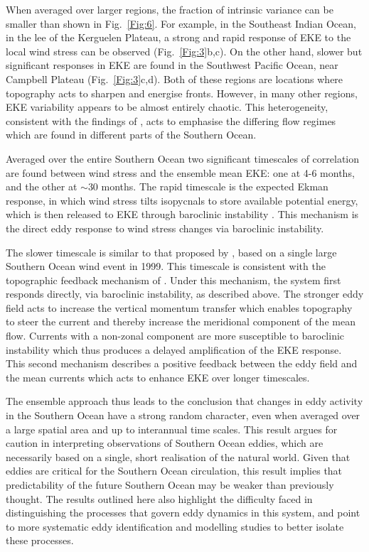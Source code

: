 \documentclass[linenumbers]{agujournal2019}
\begin{document}
When averaged over larger regions, the fraction of intrinsic variance can be smaller than shown in Fig.~\ref{Fig:6}.
For example, in the Southeast Indian Ocean, in the lee of the Kerguelen Plateau, a strong and rapid response of EKE to the local wind stress can be observed (Fig.~\ref{Fig:3}b,c).
On the other hand, slower but significant responses in EKE are found in the Southwest Pacific Ocean, near Campbell Plateau (Fig.~\ref{Fig:3}c,d).
Both of these regions are locations where topography acts to sharpen and energise fronts.
However, in many other regions, EKE variability appears to be almost entirely chaotic.
This heterogeneity, consistent with the findings of \citet{Patara2016}, acts to emphasise the differing flow regimes which are found in different parts of the Southern Ocean.

Averaged over the entire Southern Ocean two significant timescales of correlation are found between wind stress and the ensemble mean EKE: one at 4-6 months, and the other at $\sim$30 months.
The rapid timescale is the expected Ekman response, in which wind stress tilts isopycnals to store available potential energy, which is then released to EKE through baroclinic instability \citep[e.g.][]{Sinha2016}.
This mechanism is the direct eddy response to wind stress changes via baroclinic instability.

The slower timescale is similar to that proposed by \citet{Meredith-Hogg-2006}, based on a single large Southern Ocean wind event in 1999.
This timescale is consistent with the  topographic feedback mechanism of \citet{Hogg-Blundell-2006}.
Under this mechanism, the system first responds directly, via baroclinic instability, as described above. 
The stronger eddy field acts to increase the vertical momentum transfer which enables topography to steer the current and thereby increase the meridional component of the mean flow. 
Currents with a non-zonal component are more susceptible to baroclinic instability which thus produces a delayed amplification of the EKE response.
This second mechanism describes a positive feedback between the eddy field and the mean currents which acts to enhance EKE over longer timescales.
 
The ensemble approach thus leads to the conclusion that changes in eddy activity in the Southern Ocean have a strong random character, even when averaged over a large spatial area and up to interannual time scales.
This result argues for caution in interpreting observations of Southern Ocean eddies, which are necessarily based on a single, short realisation of the natural world.
Given that eddies are critical for the Southern Ocean circulation, this result implies that predictability of the future Southern Ocean may be weaker than previously thought.
The results outlined here also highlight the difficulty faced in distinguishing the processes that govern eddy dynamics in this system, and point to more systematic eddy identification and modelling studies to better isolate these processes.
\end{document}
